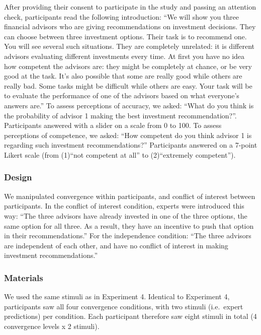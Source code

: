\documentclass[
  doc,floatsintext]{apa6}
\begin{document}
After providing their consent to participate in the study and passing an attention check, participants read the following introduction: ``We will show you three financial advisors who are giving recommendations on investment decisions. They can choose between three investment options. Their task is to recommend one. You will see several such situations. They are completely unrelated: it is different advisors evaluating different investments every time. At first you have no idea how competent the advisors are: they might be completely at chance, or be very good at the task. It's also possible that some are really good while others are really bad. Some tasks might be difficult while others are easy. Your task will be to evaluate the performance of one of the advisors based on what everyone's answers are.'' To assess perceptions of accuracy, we asked: ``What do you think is the probability of advisor 1 making the best investment recommendation?''. Participants answered with a slider on a scale from 0 to 100. To assess perceptions of competence, we asked: ``How competent do you think advisor 1 is regarding such investment recommendations?'' Participants answered on a 7-point Likert scale (from (1)``not competent at all'' to (2)``extremely competent'').

\subsubsection{Design}\label{design-4}

We manipulated convergence within participants, and conflict of interest between participants. In the conflict of interest condition, experts were introduced this way: ``The three advisors have already invested in one of the three options, the same option for all three. As a result, they have an incentive to push that option in their recommendations.'' For the independence condition: ``The three advisors are independent of each other, and have no conflict of interest in making investment recommendations.''

\subsubsection{Materials}\label{materials-4}

We used the same stimuli as in Experiment 4. Identical to Experiment 4, participants saw all four convergence conditions, with two stimuli (i.e.~expert predictions) per condition. Each participant therefore saw eight stimuli in total (4 convergence levels x 2 stimuli).
\end{document}
